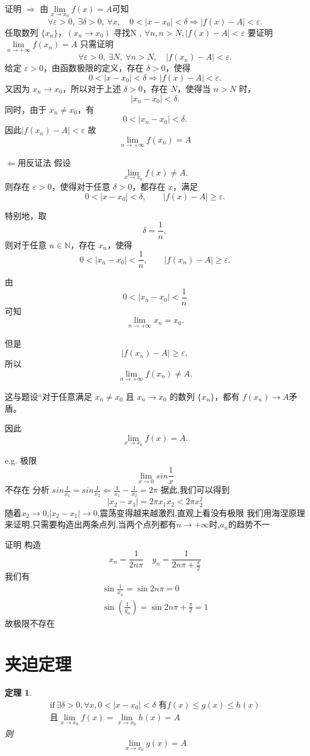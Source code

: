 \documentclass[UTF8,11pt]{ctexart}
\theoremstyle{cnthm}
\newtheorem{thm}{定理}[section]
\begin{document}
证明
$\Rightarrow$ 由$\lim\limits_{x\to x_0}f(x)=A$可知
$$
\forall\varepsilon>0,\ \exists\delta>0,\ 
\forall x,\quad
0<|x-x_0|<\delta
\Longrightarrow
|f(x)-A|<\varepsilon.
$$
任取数列 $\{x_n\}$，$(x_n \to x_0)$ 寻找N , $\forall n , n > N , |f(x)-A| < \varepsilon$
要证明$\lim\limits_{n\to+\infty}f(x_n)=A$
只需证明
$$
\forall\varepsilon>0,\ \exists N,\ \forall n>N,
\quad
|f(x_n)-A|<\varepsilon.
$$
给定 $\varepsilon>0$，由函数极限的定义，存在 $\delta>0$，使得
$$
0<|x-x_0|<\delta
\Longrightarrow
|f(x)-A|<\varepsilon.
$$
又因为 $x_n\to x_0$，所以对于上述 $\delta>0$，存在 $N$，使得当 $n>N$ 时，
$$
|x_n-x_0|<\delta.
$$
同时，由于 $x_n\neq x_0$，有
$$
0<|x_n-x_0|<\delta.
$$
因此$|f(x_n)-A|<\varepsilon$
故
$$
\lim\limits_{n\to+\infty}f(x_n)=A
$$

$\Leftarrow$用反证法
假设
$$
\lim\limits_{x\to x_0}f(x)\neq A.
$$
则存在 $\varepsilon>0$，使得对于任意 $\delta>0$，都存在 $x$，满足
$$
0<|x-x_0|<\delta,
\qquad
|f(x)-A|\geq\varepsilon.
$$

特别地，取
$$
\delta=\frac{1}{n},
$$
则对于任意 $n\in\mathbb{N}$，存在 $x_n$，使得
$$
0<|x_n-x_0|<\frac{1}{n},
\qquad
|f(x_n)-A|\geq\varepsilon.
$$

由
$$
0<|x_n-x_0|<\frac{1}{n}
$$
可知
$$
\lim\limits_{n\to+\infty}x_n=x_0.
$$

但是
$$
|f(x_n)-A|\geq\varepsilon,
$$
所以
$$
\lim\limits_{n\to+\infty}f(x_n)\neq A.
$$

这与题设“对于任意满足 $x_n\neq x_0$ 且 $x_n\to x_0$ 的数列 $\{x_n\}$，都有 $f(x_n)\to A$矛盾。

因此
$$
\lim\limits_{x\to x_0}f(x)=A.
$$

e.g. 极限
$$
\lim\limits_{x \to 0} sin \frac{1}{x}
$$
不存在
分析
$sin\frac{1}{x_1} = sin\frac{1}{x_2} \Leftarrow \frac{1}{x_1} - \frac{1}{x_2} = 2\pi$
据此,我们可以得到
$$
|x_2-x_1| = 2\pi x_1x_2 < 2\pi x_2^2
$$
随着$x_2 \to 0$,$|x_2-x_1| \to 0$,震荡变得越来越激烈,直观上看没有极限
我们用海涅原理来证明,只需要构造出两条点列,当两个点列都有$n \to +\infty$时,$a_n$的趋势不一

证明
构造
$$
x_n = \frac{1}{2n\pi} \quad y_n = \frac{1}{2n\pi + \frac{\pi}{2}}
$$
我们有
$$\begin{aligned}
\sin{\frac{1}{x_n}} = \sin{2n\pi} = 0 \\
\sin(\frac{1}{y_n}) = \sin{2n\pi + \frac{\pi}{2}} = 1
\end{aligned}
$$
故极限不存在

\section{夹迫定理}

\begin{thm}
$$\begin{aligned}
\text{if} \ \exists \delta>0 , \forall x , 0<|x-x_0|<\delta \text{ 有}
f(x) \leq g(x) \leq h(x)\\
\text{且}\lim\limits_{x \to x_0}f(x) = \lim\limits_{x \to x_0}h(x) = A
\end{aligned}
$$
则
$$
\lim\limits_{x \to x_0}g(x) = A
$$
\end{thm}
\end{document}
